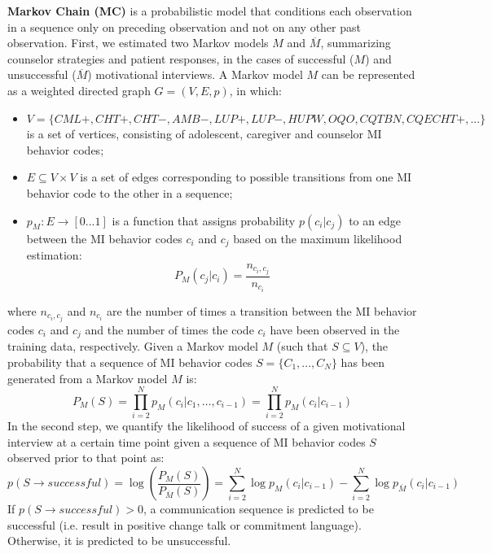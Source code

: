 \documentclass{amia_summit_2018}
\begin{document}
\textbf {Markov Chain (MC)} is a probabilistic model that conditions each observation in a sequence only on preceding observation and not on any other past observation. First, we estimated two Markov models $M$ and $\overline{M}$, summarizing counselor strategies and patient responses, in the cases of successful ($M$) and unsuccessful ($\overline{M}$) motivational interviews. A
Markov model $M$ can be represented as a weighted directed graph $G = (V, E, p)$, in which:
\begin{itemize}
\item $V = \{CML+, CHT+, CHT-, AMB-, LUP+, LUP-, HUPW, OQO, CQTBN, CQECHT+,...\}$ is a set of vertices, consisting of adolescent, caregiver and counselor MI behavior codes;
\item $E \subseteq V \times V$ is a set of edges corresponding to possible transitions from one MI behavior code to the other in a sequence;
\item $p_M:E\rightarrow[0...1]$ is a function that assigns probability $p(c_i|c_j)$ to an edge between the MI behavior codes $c_i$ and $c_j$ based on the maximum likelihood estimation:
\begin{equation}
P_M(c_j|c_i) = \frac{n_{c_i,c_j}}{n_{c_i}}
\end{equation}
\end{itemize}
where $n_{c_i,c_j}$ and $n_{c_i}$ are the number of times a transition between the MI behavior codes $c_i$ and $c_j$ and the number of times the code $c_i$ have been observed in the training data, respectively. Given a Markov model $M$ (such that $S\subseteq V$), the probability that a sequence of MI behavior codes $S = \{C_1,...,C_N\}$ has been generated from a Markov model $M$ is:
\begin{equation}
P_M(S) = \prod_{i=2}^N p_M(c_i|c_1,\dots,c_{i-1})=\prod_{i=2}^N p_M(c_i|c_{i-1})
\end{equation}
In the second step, we quantify the likelihood of success of a given motivational interview at a certain time point given a sequence of MI behavior codes $S$ observed prior to that point as:
\begin{equation}
p(S\rightarrow successful) = \log\left(\frac{P_M(S)}{P_{\overline M}(S)}\right)= \sum_{i=2}^N \log p_M(c_i|c_{i-1})-\sum_{i=2}^N \log p_{\overline M}(c_i|c_{i-1})\label{eq:class}
\end{equation}
If $p(S\rightarrow successful) > 0 $, a communication sequence is predicted to be successful (i.e. result in positive change talk or commitment language). Otherwise, it is predicted to be unsuccessful.
\end{document}
